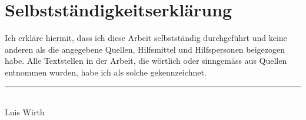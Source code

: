 \printbibliography[heading=bibintoc]

\listoffigures

\listoftables

\chapter*{Selbstständigkeitserklärung}
Ich erkläre hiermit, dass ich diese Arbeit selbstständig durchgeführt und keine
anderen als die angegebene Quellen, Hilfsmittel und Hilfspersonen beigezogen
habe. Alle Textstellen in der Arbeit, die wörtlich oder sinngemäss aus Quellen
entnommen wurden, habe ich als solche gekennzeichnet.

\vspace{2cm}
\begin{center}
  \noindent\rule{5cm}{0.4pt}\\
  Luis Wirth
\end{center}


